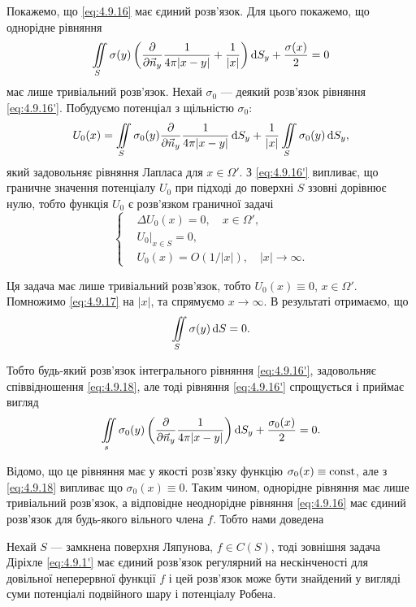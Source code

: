 Покажемо, що \eqref{eq:4.9.16} має єдиний розв'язок. Для цього покажемо, що однорідне рівняння
\begin{equation}
	\label{eq:4.9.16'}
	\displaystyle\iint\limits_S \sigma(y) \left( \frac{\partial}{\partial \vec n_y} \frac{1}{4 \pi |x - y|} + \frac{1}{|x|} \right) \mathop{}\!\mathrm{d} S_y + \frac{\sigma(x)}{2} = 0
\end{equation}
має лише тривіальний розв'язок. Нехай $\sigma_0$ --- деякий розв'язок рівняння \eqref{eq:4.9.16'}. Побудуємо потенціал з щільністю $\sigma_0$:
\begin{equation}
	\label{eq:4.9.17}
	U_0(x) = \displaystyle\iint\limits_S \sigma_0(y) \frac{\partial}{\partial \vec n_y} \frac{1}{4 \pi |x - y|} \mathop{}\!\mathrm{d} S_y + \frac{1}{|x|} \displaystyle\iint\limits_S \sigma_0(y) \mathop{}\!\mathrm{d} S_y,
\end{equation}
який задовольняє рівняння Лапласа для $x \in \Omega'$. З \eqref{eq:4.9.16'} випливає, що граничне значення потенціалу $U_0$ при підході до поверхні $S$ ззовні дорівнює нулю, тобто функція $U_0$ є розв'язком граничної задачі
\begin{equation}
	\left\{
		\begin{aligned}
			& \Delta U_0(x) = 0, \quad x \in \Omega', \\
			& \left. U_0 \right|_{x \in S} = 0, \\
			& U_0(x) = O(1/|x|), \quad |x| \to \infty.
		\end{aligned}		
	\right.
\end{equation}

Ця задача має лише тривіальний розв'язок, тобто $U_0(x) \equiv 0$, $x \in \Omega'$. Помножимо \eqref{eq:4.9.17} на $|x|$, та спрямуємо $x \to \infty$. В результаті отримаємо, що
\begin{equation}
	\label{eq:4.9.18}
	\displaystyle\iint\limits_S \sigma(y) \mathop{}\!\mathrm{d} S = 0.
\end{equation}

Тобто будь-який розв'язок інтегрального рівняння \eqref{eq:4.9.16'}, задовольняє співвідношення \eqref{eq:4.9.18}, але тоді рівняння \eqref{eq:4.9.16'} спрощується і приймає вигляд
\begin{equation}
	\displaystyle\iint\limits_s \sigma_0(y) \left( \frac{\partial}{\partial \vec n_y} \frac{1}{4 \pi |x - y|} \right) \mathop{}\!\mathrm{d} S_y + \frac{\sigma_0(x)}{2} = 0.
\end{equation}

Відомо, що це рівняння має у якості розв'язку функцію $\sigma_0(x) \equiv \operatorname{const}$, але з \eqref{eq:4.9.18} випливає що $\sigma_0(x) \equiv 0$. Таким чином, однорідне рівняння має лише тривіальний розв'язок, а відповідне неоднорідне рівняння \eqref{eq:4.9.16} має єдиний розв'язок для будь-якого вільного члена $f$. Тобто нами доведена
\begin{theorem}
	Нехай $S$ --- замкнена поверхня Ляпунова, $f \in C(S)$, тоді зовнішня задача Діріхле \eqref{eq:4.9.1'} має єдиний розв'язок регулярний на нескінченості для довільної неперервної функції $f$ і цей розв'язок може бути знайдений у вигляді суми потенціалі подвійного шару і потенціалу Робена.
\end{theorem}

